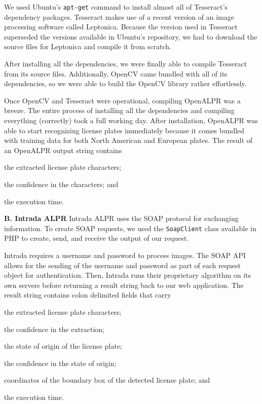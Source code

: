 \documentclass[11pt, oneside, fullpage, doublespace]{article}
\begin{document}
We used Ubuntu's \verb+apt-get+ command to install almost all of Tesseract's dependency packages. Tesseract makes use of a recent version of an image processing software called Leptonica. Because the version used in Tesseract superseded the versions available in Ubuntu's repository, we had to download the source files for Leptonica and compile it from scratch.

After installing all the dependencies, we were finally able to compile Tesseract from its source files. Additionally, OpenCV came bundled with all of its dependencies, so we were able to build the OpenCV library rather effortlessly.

Once OpenCV and Tesseract were operational, compiling OpenALPR was a breeze. The entire process of installing all the dependencies and compiling everything (correctly) took a full working day. After installation, OpenALPR was able to start recognizing license plates immediately because it comes bundled with training data for both North American and European plates. The result of an OpenALPR output string contains
\begin{inparaenum}
\item the extracted license plate characters;
\item the confidence in the characters; and
\item the execution time.
\end{inparaenum}

\textbf{B. Intrada ALPR}
Intrada ALPR uses the SOAP protocol for exchanging information. To create SOAP requests, we used the \verb+SoapClient+ class available in PHP to create, send, and receive the output of our request.

Intrada requires a username and password to process images. The SOAP API allows for the sending of the username and password as part of each request object for authentication. Then, Intrada runs their proprietary algorithm on its own servers before returning a result string back to our web application. The result string contains colon delimited fields that carry 
\begin{inparaenum}
\item the extracted license plate characters;
\item the confidence in the extraction;
\item the state of origin of the license plate;
\item the confidence in the state of origin;
\item coordinates of the boundary box of the detected license plate; and
\item the execution time.
\end{inparaenum}
\end{document}
